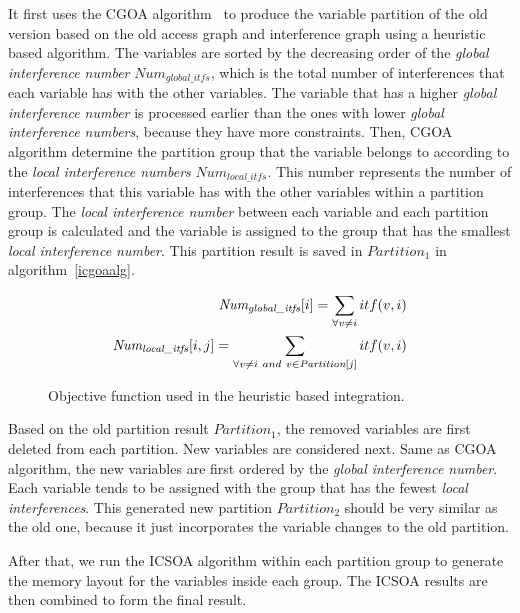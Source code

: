 It first uses the CGOA algorithm~\cite{related:ottoni} to produce the variable partition of the old version based on the old access graph and interference graph using a heuristic based algorithm. 
The variables are sorted by the decreasing order of the {\it global interference number} $\textit{Num}_{\textit{global}\_\textit{itfs}}$, which is the total number of interferences that each variable has with the other variables. The variable that has a higher {\it global interference number} is processed earlier than the ones with lower {\it global interference numbers}, because they have more constraints.
Then, CGOA algorithm determine the partition group that the variable belongs to according to the {\it local interference numbers} $\textit{Num}_{\textit{local}\_\textit{itfs}}$. This number represents the number of interferences that this variable has with the other variables within a partition group. The {\it local interference number} between each variable and each partition group is calculated and the variable is assigned to the group that has the smallest {\it local interference number}.
This partition result is saved in $\textit{Partition}_1$ in algorithm~\ref{icgoaalg}.

\begin{figure}[ht]
\begin{small}
\begin{eqnarray}
\textit{Num}_{\textit{global}\_\textit{itfs}}[i] = \sum_{\forall v \neq i}itf(v,i)\\
\textit{Num}_{\textit{local}\_\textit{itfs}}[i,j] = \sum_{\forall v\neq i \mbox~{and}~ v\in \textit{Partition}[j] }itf(v,i)
\end{eqnarray}
\end{small}
\caption{Objective function used in the heuristic based integration.}
\label{newObj2}
\end{figure}

Based on the old partition result $\textit{Partition}_1$, the removed variables are first deleted from each partition. New variables are considered next. 
Same as CGOA algorithm, the new variables are first ordered by the {\it global interference number}.
Each variable tends to be assigned with the group that has the fewest {\it local interferences}.
This generated new partition $\textit{Partition}_2$ should be very similar as the old one, because it just incorporates the variable changes to the old partition.

After that, we run the ICSOA algorithm within each partition group to generate the memory layout for the variables inside each group.
The ICSOA results are then combined to form the final result.


